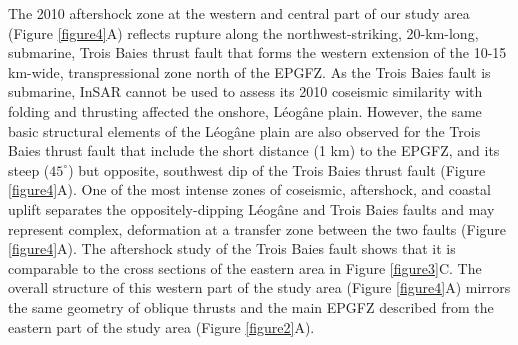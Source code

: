 \documentclass[man,natbib]{apa6}
\begin{document}
The 2010 aftershock zone at the western and central part of our study area (Figure \ref{figure4}A) reflects rupture along the northwest-striking, 20-km-long, submarine, Trois Baies thrust fault that forms the western extension of the 10-15 km-wide, transpressional zone north of the EPGFZ. As the Trois Baies fault is submarine, InSAR cannot be used to assess its 2010 coseismic similarity with folding and thrusting affected the onshore, L\'eog\^ane plain. However, the same basic structural elements of the L\'eog\^ane plain are also observed for the Trois Baies thrust fault that include the short distance (1 km) to the EPGFZ, and its steep ($45^{\circ}$) but opposite, southwest dip of the Trois Baies thrust fault (Figure \ref{figure4}A). One of the most intense zones of coseismic, aftershock, and coastal uplift separates the oppositely-dipping L\'eog\^ane and Trois Baies faults and may represent complex, deformation at a transfer zone between the two faults (Figure \ref{figure4}A). The aftershock study of the Trois Baies fault \citep{symithe2016present} shows that it is comparable to the cross sections of the eastern area in Figure \ref{figure3}C. The overall structure of this western part of the study area (Figure \ref{figure4}A) mirrors the same geometry of oblique thrusts and the main EPGFZ described from the eastern part of the study area (Figure \ref{figure2}A).
\end{document}
